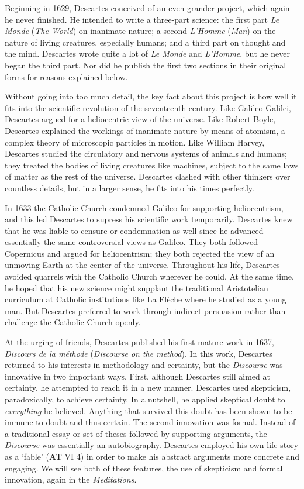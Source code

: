Beginning in 1629, Descartes conceived of an even grander project, which again he never finished. He intended to write a three-part science: the first part \textit{Le Monde} (\textit{The World}) on inanimate nature; a second \textit{L'Homme} (\textit{Man}) on the nature of living creatures, especially humans; and a third part on thought and the mind. Descartes wrote quite a lot of \textit{Le Monde} and \textit{L'Homme}, but he never began the third part. Nor did he publish the first two sections in their original forms for reasons explained below.

Without going into too much detail, the key fact about this project is how well it fits into the scientific revolution of the seventeenth century. Like Galileo Galilei, Descartes argued for a heliocentric view of the universe. Like Robert Boyle, Descartes explained the workings of inanimate nature by means of atomism, a complex theory of microscopic particles in motion. Like William Harvey, Descartes studied the circulatory and nervous systems of animals and humans; they treated the bodies of living creatures like machines, subject to the same laws of matter as the rest of the universe. Descartes clashed with other thinkers over countless details, but in a larger sense, he fits into his times perfectly.

In 1633 the Catholic Church condemned Galileo for supporting heliocentrism, and this led Descartes to supress his scientific work temporarily. Descartes knew that he was liable to censure or condemnation as well since he advanced essentially the same controversial views as Galileo. They both followed Copernicus and argued for heliocentrism; they both rejected the view of an unmoving Earth at the center of the universe. Throughout his life, Descartes avoided quarrels with the Catholic Church wherever he could. At the same time, he hoped that his new science might supplant the traditional Aristotelian curriculum at Catholic institutions like La Flèche where he studied as a young man. But Descartes preferred to work through indirect persuasion rather than challenge the Catholic Church openly.

At the urging of friends, Descartes published his first mature work in 1637, \textit{Discours de la méthode} (\textit{Discourse on the method}). In this work, Descartes returned to his interests in methodology and certainty, but the \textit{Discourse} was innovative in two important ways. First, although Descartes still aimed at certainty, he attempted to reach it in a new manner. Descartes used skepticism, paradoxically, to achieve certainty. In a nutshell, he applied skeptical doubt to \textit{everything} he believed. Anything that survived this doubt has been shown to be immune to doubt and thus certain. The second innovation was formal. Instead of a traditional essay or set of theses followed by supporting arguments, the \textit{Discourse} was essentially an autobiography. Descartes employed his own life story as a `fable' (\textbf{AT} VI 4) in order to make his abstract arguments more concrete and engaging. We will see both of these features, the use of skepticism and formal innovation, again in the \textit{Meditations}.

